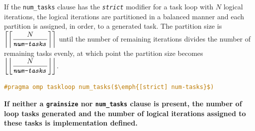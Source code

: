 \highspace
If the \texttt{num\_tasks} clause has the \texttt{\emph{strict}} modifier for a task loop with $N$ logical iterations, the logical iterations are partitioned in a balanced manner and each partition is assigned, in order, to a generated task. The partition size is $\left\lceil\left\lceil \dfrac{N}{\texttt{\emph{num-tasks}}} \right\rceil \right\rceil$ until the number of remaining iterations divides the number of remaining tasks evenly, at which point the partition size becomes $\left\lfloor\left\lfloor \dfrac{N}{\texttt{\emph{num-tasks}}} \right\rfloor\right\rfloor$.
\begin{openmpbox}
    \begin{lstlisting}[language=C++, mathescape=true]
#pragma omp taskloop num_tasks($\emph{[strict] num-tasks}$)\end{lstlisting}
\end{openmpbox}

\highspace
\textbf{If neither a \texttt{grainsize} nor \texttt{num\_tasks} clause is present, the number of loop tasks generated and the number of logical iterations assigned to these tasks is implementation defined.}
